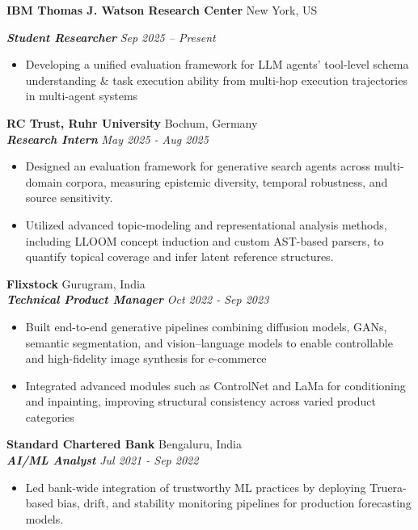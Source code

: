 \documentclass[a4paper,11pt]{article}
\begin{document}
{\color{boldcolor}\textbf{IBM Thomas J. Watson Research Center}} 
\hfill New York, US\\
{\color{lightboldcolor}\textbf{\textit{Student Researcher}} \hfill \textit{\small Sep 2025 – Present}
\begin{itemize}
    \item Developing a unified evaluation framework for LLM agents’ tool-level schema understanding \& task execution ability from multi-hop execution trajectories in multi-agent systems
\end{itemize}
\vspace{0.2cm}

{\color{boldcolor}\textbf{RC Trust, Ruhr University}} \hfill Bochum, Germany\\
{\color{lightboldcolor}\textbf{\textit{Research Intern}}} \hfill \textit{\small May 2025 - Aug 2025}
\begin{itemize}
    \item Designed an evaluation framework for generative search agents across multi-domain corpora, measuring epistemic diversity, temporal robustness, and source sensitivity.
    \item Utilized advanced topic-modeling and representational analysis methods, including LLOOM concept induction and custom AST-based parsers, to quantify topical coverage and infer latent reference structures.
\end{itemize}
\vspace{0.05cm}

{\color{boldcolor}\textbf{Flixstock}} \hfill Gurugram, India\\
{\color{lightboldcolor}\textbf{\textit{Technical Product Manager}}} \hfill \textit{\small Oct 2022 - Sep 2023}
\begin{itemize}
    \item Built end-to-end generative pipelines combining diffusion models, GANs, semantic segmentation, and vision–language models to enable controllable and high-fidelity image synthesis for e-commerce
    \item Integrated advanced modules such as ControlNet and LaMa for conditioning and inpainting, improving structural consistency across varied product categories
\end{itemize}
\vspace{0.05cm}

{\color{boldcolor}\textbf{Standard Chartered Bank}} \hfill Bengaluru, India \\
{\color{lightboldcolor}\textbf{\textit{AI/ML Analyst}}} \hfill \textit{\small Jul 2021 - Sep 2022}
\begin{itemize}
    \item Led bank-wide integration of trustworthy ML practices by deploying Truera-based bias, drift, and stability monitoring pipelines for production forecasting models.
\end{itemize}
\vspace{0.05cm}

}
\end{document}
